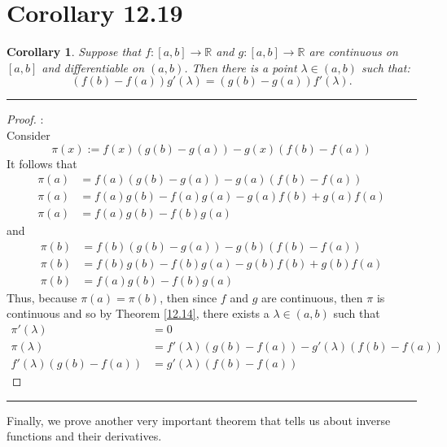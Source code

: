 \documentclass[openany, amssymb, psamsfonts]{amsart}
\newcommand{\bbR}{\mathbb{R}}
\newtheorem{cor}{Corollary}[section]
\theoremstyle{definition}
\numberwithin{equation}{section}
\begin{document}
\section*{Corollary 12.19}
\begin{cor}	
\label{12.19}
	Suppose that $f\colon [a, b] \to \bbR$ and $g\colon[a, b] \to \bbR$ are continuous on $[a, b]$ and differentiable on $(a, b)$. Then there is a point $\lambda \in (a, b)$ such that:
	\[
		(f(b)-f(a))g'(\lambda) = (g(b)-g(a))f'(\lambda).
	\]
\end{cor}
\vspace{4pt}     \hrule   \vspace{4pt} \begin{proof}:\\
Consider \[\pi(x) := f(x)(g(b) - g(a)) - g(x)(f(b) - f(a))\]
It follows that \begin{align*}
\pi(a) &= f(a)(g(b) - g(a)) - g(a)(f(b) - f(a))\\
\pi(a) &= f(a)g(b) - f(a)g(a) - g(a)f(b) + g(a)f(a)\\
\pi(a) &= f(a)g(b) - f(b)g(a)
\end{align*}
and 
\begin{align*}
\pi(b) &= f(b)(g(b) - g(a)) - g(b)(f(b) - f(a))\\
\pi(b) &= f(b)g(b) - f(b)g(a) - g(b)f(b) + g(b)f(a)\\
\pi(b) &= f(a)g(b) - f(b)g(a)
\end{align*}
Thus, because $\pi(a) = \pi(b)$, then since $f$ and $g$ are continuous, then $\pi$ is continuous and so by Theorem \ref{12.14}, there exists a $\lambda\in (a,b)$ such that \begin{align*}
    \pi'(\lambda) &= 0\\
    \pi(\lambda) &= f'(\lambda)(g(b) - f(a)) - g'(\lambda)(f(b) - f(a))\\
    f'(\lambda)(g(b) - f(a)) &= g'(\lambda)(f(b) - f(a))
\end{align*}
\end{proof}\vspace{4pt}     \hrule   \vspace{4pt}

Finally, we prove another very important theorem that tells us about inverse functions and their derivatives. 
\end{document}
